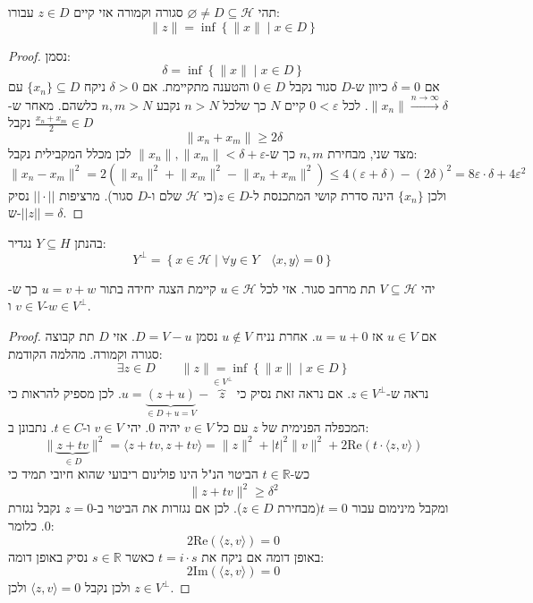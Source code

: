 \documentclass{tstextbook}
\begin{document}
\begin{lemma}
תהי \(\varnothing \neq D \subseteq \mathcal{H}\) סגורה וקמורה אזי קיים \(z \in D\) עבורו:
$$\lVert z \rVert =\inf\left\{  \lVert x \rVert \mid x \in D \right\}$$

\end{lemma}
\begin{proof}
נסמן:
$$\delta=\inf\left\{  \lVert x \rVert  \mid x \in D  \right\}$$
אם \(\delta =0\) כיוון ש-\(D\) סגור נקבל \(0 \in D\) והטענה מתקיימת. 
אם \(\delta> 0\) ניקח \(\{ x_{n} \}\subseteq D\) עם \(\lVert x_{n} \rVert\xrightarrow{n\to \infty}\delta\). לכל \(0<\varepsilon\) קיים \(N\) כך שלכל \(n>N\) נקבע \(n,m>N\) כלשהם. מאחר ש- \(\frac{x_{n}+x_{m}}{2}\in D\) נקבל
$$\lVert x_{n}+x_{m} \rVert \geq 2\delta$$
מצד שני, מבחירת \(n,m\) כך ש-\(\lVert x_{n} \rVert,\lVert x_{m} \rVert<\delta+\varepsilon\) לכן מכלל המקבילית נקבל:
$$\lVert x_{n}-x_{m} \rVert ^{2}= 2\left( \lVert x_{n} \rVert ^{2}+\lVert x_{m} \rVert ^{2}-\lVert x_{n}+x_{m} \rVert ^{2} \right)\leq 4\left( \varepsilon+\delta \right)-\left( 2\delta \right)^{2}=8\varepsilon \cdot \delta+4\varepsilon^{2}$$
ולכן \(\{ x_{n} \}\) הינה סדרת קושי המתכנסת ל-\(z \in D\)(כי \(\mathcal{H}\) שלם ו-\(D\) סגור). מרציפות \(||\cdot||\) נסיק ש-\(||z||=\delta\).

\end{proof}
\begin{definition}
בהנתן \(Y\subseteq H\) נגדיר:
$$Y^{\perp}= \left\{  x \in \mathcal{H} \mid \forall y \in Y\quad \langle x,y \rangle =0 \right\}$$

\end{definition}
\begin{theorem}
יהי \(V\subseteq \mathcal{H}\) תת מרחב סגור. אזי לכל \(u\in \mathcal{H}\) קיימת הצגה יחידה בתור \(u=v+w\)  כך ש-\(v \in V\) ו-\(w \in V^{\perp}\).

\end{theorem}
\begin{proof}
אם \(u\in V\) אז \(u=u+0\). אחרת נניח \(u\not \in V\) נסמן \(D=V-u\). אזי \(D\) תת קבוצה סגורה וקמורה. מהלמה הקודמת:
$$\exists z \in D\qquad \lVert z \rVert = \inf \left\{  \lVert x \rVert \mid x \in D  \right\}$$
נראה ש-\(z \in V^{\perp}\). אם נראה זאת נסיק כי \(u=\underbrace{ (z+u) }_{ \in D+u=V }-\overbrace{ z }^{ \in V^{\perp} }\).
לכן מספיק להראות כי המכפלה הפנימית של \(z\) עם כל \(v\in V\) יהיה 0. יהי \(v \in V\) ו-\(t \in C\). נתבונן ב:
$$\lVert \underbrace{ z+tv }_{ \in D } \rVert ^{2}=\langle z+tv,z+tv \rangle =\lVert z \rVert ^{2}+|t|^{2}\lVert v \rVert ^{2}+2\mathrm{Re}\left( t\cdot \langle z,v \rangle  \right)$$
כש-\(t \in \mathbb{R}\) הביטוי הנ"ל הינו פולינום ריבועי שהוא חיובי תמיד כי 
$$\lVert z+tv \rVert^{2}\geq \delta^{2}$$
ומקבל מינימום עבור \(t=0\)(מבחירת \(z \in D\)). לכן אם נגזרות את הביטוי ב-\(z=0\) נקבל נגזרת 0. כלומר:
$$2\mathrm{Re}\left( \langle z,v \rangle  \right)=0$$
באופן דומה אם ניקח את \(t=i\cdot s\) כאשר \(s \in \mathbb{R}\) נסיק באופן דומה:
$$2\mathrm{Im}\left( \langle z,v \rangle  \right)=0$$
ולכן נקבל \(\langle z,v \rangle=0\) ולכן \(z\in V^{\perp}\).

\end{proof}
\end{document}
